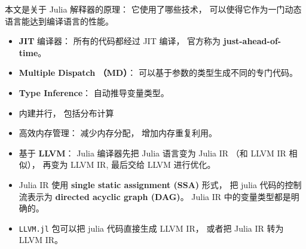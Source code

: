 
\begin{issues}
\issueDraft
\end{issues}

本文是关于 Julia 解释器的原理： 它使用了哪些技术， 可以使得它作为一门动态语言能达到编译语言的性能。

\begin{itemize}
\item \textbf{JIT} 编译器： 所有的代码都经过 JIT 编译， 官方称为 \textbf{just-ahead-of-time}。
\item \textbf{Multiple Dispatch （MD）}： 可以基于参数的类型生成不同的专门代码。
\item \textbf{Type Inference}： 自动推导变量类型。
\item 内建并行， 包括分布计算
\item 高效内存管理： 减少内存分配， 增加内存重复利用。
\item 基于 \textbf{LLVM}： Julia 编译器先把 Julia 语言变为 Julia IR （和 LLVM IR 相似）， 再变为 LLVM IR, 最后交给 LLVM 进行优化。
\item Julia IR 使用 \textbf{single static assignment (SSA)} 形式， 把 julia 代码的控制流表示为 \textbf{directed acyclic graph (DAG)}。 Julia IR 中的变量类型都是明确的。
\item \verb|LLVM.jl| 包可以把 julia 代码直接生成 LLVM IR， 或者把 Julia IR 转为 LLVM IR。
\end{itemize}
